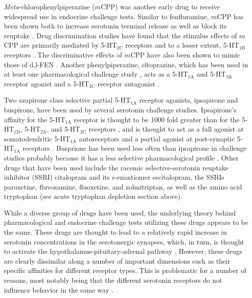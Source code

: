 \emph{Meta}-chlorophenylpiperazine ($m$CPP) was another early drug to receive widespread use in endocrine challenge tests. Similar to fenfluramine, $m$CPP has been shown both to increase serotonin terminal release as well as block its reuptake \parencite{Pettibone1984}. Drug discrimination studies have found that the stimulus effects of $m$CPP are primarily mediated by 5-HT$_\textrm{2C}$ receptors and to a lesser extent, 5-HT$_\textrm{1B}$ receptors \parencite{Callahan1994, Gatch2003, Gommans1998}. The discriminative effects of $m$CPP have also been shown to mimic those of d,l-FEN \parencite{Callahan1994}. Another phenylpiperazine, eltoprazine, which has been used in at least one pharmacological challenge study \parencite{Cherek1995}, acts as a 5-HT$_\textrm{1A}$ and 5-HT$_\textrm{1B}$ receptor agonist and a 5-HT$_\textrm{2C}$ receptor antagonist \parencite{Schipper1990}.


Two azapirone class selective partial 5-HT$_\textrm{1A}$ receptor agonists, ipsapirone and buspirone, have been used by several serotonin challenge studies. Ipsapirone's affinity for the 5-HT$_\textrm{1A}$ receptor is thought to be 1000 fold greater than for the 5-HT$_\textrm{1D}$, 5-HT$_\textrm{2A}$, and 5-HT$_\textrm{2C}$ receptors \parencite{Hamon1988}, and is thought to act as a full agonist at somatodendritic 5-HT$_\textrm{1A}$ autoreceptors and a partial agonist at post-synaptic 5-HT$_\textrm{1A}$ receptors \parencite{Almeida2010}. Busprione has been used less often than ipsapirone in challenge studies probably because it has a less selective pharmacological profile \parencite[e.g.,][]{Moser1990}. 
Other drugs that have been used include the racemic selective-serotonin reuptake inhibitor (SSRI) citalopram and its s-enantiomer escitalopram, the SSRIs paroxetine, fluvoxamine, fluoxetine, and zolmitriptan, as well as the amino acid tryptophan (see acute tryptophan depletion section above). 
 
 
While a diverse group of drugs have been used, the underlying theory behind pharmacological and endocrine challenge tests utilizing these drugs appears to be the same. These drugs are thought to lead to a relatively rapid increase in serotonin concentrations in the serotonergic synapses, which, in turn, is thought to activate the hypothalamus-pituitary-adrenal pathway \parencite{Berman2009, Kojima2003}. However, these drugs are clearly dissimilar along a number of important dimensions such as their specific affinities for different receptor types. This is problematic for a number of reasons, most notably being that the different serotonin receptors do not influence behavior in the same way \parencite{Quadros2009}.


